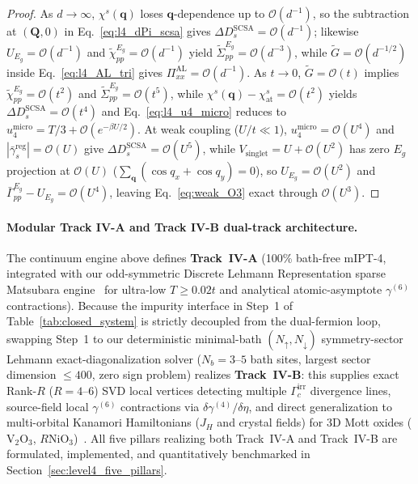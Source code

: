 \documentclass[11pt,a4paper]{article}
\numberwithin{equation}{section}
\theoremstyle{plain}
\theoremstyle{definition}
\providecommand{\vq}{\mathbf{q}}
\providecommand{\vQ}{\mathbf{Q}}
\begin{document}
\begin{proof}
As $d \to \infty$, $\chi^s(\vq)$ loses $\vq$-dependence up to $\mathcal{O}(d^{-1})$, so
the subtraction at $(\vQ,0)$ in Eq.~\eqref{eq:l4_dPi_scsa} gives
$\Delta D_s^{\mathrm{SCSA}} = \mathcal{O}(d^{-1})$; likewise $U_{E_g} = \mathcal{O}(d^{-1})$
and $\tilde{\chi}_{pp}^{E_g} = \mathcal{O}(d^{-1})$ yield $\tilde{\Sigma}_{pp}^{E_g} = \mathcal{O}(d^{-3})$,
while $\tilde{G} = \mathcal{O}(d^{-1/2})$ inside Eq.~\eqref{eq:l4_AL_tri} gives
$\Pi_{xx}^{\mathrm{AL}} = \mathcal{O}(d^{-1})$.
As $t \to 0$, $\tilde{G} = \mathcal{O}(t)$ implies $\tilde{\chi}_{pp}^{E_g} = \mathcal{O}(t^2)$
and $\tilde{\Sigma}_{pp}^{E_g} = \mathcal{O}(t^5)$, while $\chi^s(\vq) - \chi_{\mathrm{at}}^s = \mathcal{O}(t^2)$
yields $\Delta D_s^{\mathrm{SCSA}} = \mathcal{O}(t^4)$ and Eq.~\eqref{eq:l4_u4_micro}
reduces to $u_4^{\mathrm{micro}} = T/3 + \mathcal{O}(e^{-\beta U/2})$.
At weak coupling ($U/t \ll 1$), $u_4^{\mathrm{micro}} = \mathcal{O}(U^4)$ and
$|\bar{\gamma}_s^{\mathrm{reg}}| = \mathcal{O}(U)$ give
$\Delta D_s^{\mathrm{SCSA}} = \mathcal{O}(U^5)$, while
$V_{\mathrm{singlet}} = U + \mathcal{O}(U^2)$ has zero $E_g$ projection at
$\mathcal{O}(U)$ ($\sum_{\vq}(\cos q_x + \cos q_y) = 0$), so $U_{E_g} = \mathcal{O}(U^2)$
and $\bar{\Gamma}_{pp}^{E_g} - U_{E_g} = \mathcal{O}(U^4)$, leaving
Eq.~\eqref{eq:weak_O3} exact through $\mathcal{O}(U^3)$.
\end{proof}

\paragraph{Modular Track IV-A and Track IV-B dual-track architecture.}
The continuum engine above defines \textbf{Track~IV-A} (100\% bath-free mIPT-4, integrated
with our odd-symmetric Discrete Lehmann Representation sparse Matsubara engine~\cite{Kaye2022}
for ultra-low $T \ge 0.02t$ and analytical atomic-asymptote $\gamma^{(6)}$ contractions).
Because the impurity interface in Step~1 of Table~\ref{tab:closed_system} is strictly
decoupled from the dual-fermion loop, swapping Step~1 to our deterministic minimal-bath
$(N_\uparrow, N_\downarrow)$ symmetry-sector Lehmann exact-diagonalization solver
($N_b = 3$--$5$ bath sites, largest sector dimension $\le 400$, zero sign problem) realizes
\textbf{Track~IV-B}: this supplies exact Rank-$R$ ($R = 4$--$6$) SVD local vertices
detecting multiple $\Gamma_c^{\mathrm{irr}}$ divergence lines, source-field local
$\gamma^{(6)}$ contractions via $\delta\gamma^{(4)}/\delta\eta$, and direct generalization
to multi-orbital Kanamori Hamiltonians ($J_H$ and crystal fields) for 3D Mott oxides
($\mathrm{V}_2\mathrm{O}_3$, $R\mathrm{NiO}_3$)~\cite{Limelette2003,Qazilbash2008,Catalano2018}.
All five pillars realizing both Track~IV-A and Track~IV-B are formulated, implemented,
and quantitatively benchmarked in Section~\ref{sec:level4_five_pillars}.
\end{document}
